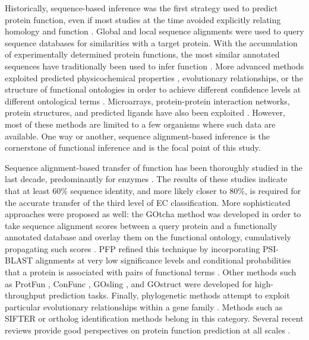 Historically, sequence-based inference was the first strategy used to predict protein function, even if most studies at the time avoided explicitly relating homology and function \citep{Doolittle1986}. Global and local sequence alignments were used to query sequence databases for similarities with a target protein. With the accumulation of experimentally determined protein functions, the most similar annotated sequences have traditionally been used to infer function \citep{Rost2003}. More advanced methods exploited predicted physicochemical properties \citep{Jensen2002,Jensen2003}, evolutionary relationships\citep{Engelhardt2005,Pellegrini1999,Bandyopadhyay2006b}, or the structure of functional ontologies in order to achieve different confidence levels at different ontological terms \citep{Barutcuoglu2006,Hawkins2006,Martin2004}. Microarrays, protein-protein interaction networks, protein structures, and predicted ligands have also been exploited \citep{Deng2003,Hermann2007,Lee2004,Troyanskaya2003,Letovsky2003,Nabieva2005,Pal2005,Pazos2004,Song2007,Vazquez2003}. However, most of these methods are limited to a few organisms where such data are available. One way or another, sequence alignment-based inference is the cornerstone of functional inference and is the focal point of this study.

Sequence alignment-based transfer of function has been thoroughly studied in the last decade, predominantly for enzymes \citep{Addou2009,Devos2000,Rost2003,Tian2003,Todd2001,Wilson2000}. The results of these studies indicate that at least $60\%$ sequence identity, and more likely closer to $80\%$, is required for the accurate transfer of the third level of EC classification. More sophisticated approaches were proposed as well: the GOtcha method was developed in order to take sequence alignment scores between a query protein and a functionally annotated database and overlay them on the functional ontology, cumulatively propagating such scores \citep{Martin2004}. PFP refined this technique by incorporating PSI-BLAST alignments at very low significance levels and conditional probabilities that a protein is associated with pairs of functional terms \citep{Hawkins2006} . Other methods such as ProtFun \citep{Jensen2003}, ConFunc \citep{Wass2008}, GOsling \citep{Jones2008a}, and GOstruct \citep{Sokolov2010} were developed for high-throughput prediction tasks. Finally, phylogenetic methods attempt to exploit particular evolutionary relationships within a gene family \citep{Brown2006,Eisen1998}. Methods such as SIFTER \citep{Engelhardt2005} or ortholog identification methods \citep{Remm2001} belong in this category. Several recent reviews provide good perspectives on protein function prediction at all scales \citep{Dalkilic2008,Friedberg2006,Kann2007,Laskowski2008,Lee2007,Punta2008,Rentzsch2009,Rost2003}.